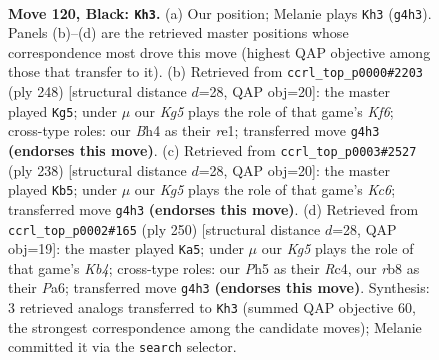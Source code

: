 \documentclass[11pt]{article}
\begin{document}
\clearpage

\begin{figure}[p]\centering
\begin{subfigure}{0.46\textwidth}\centering
\resizebox{\linewidth}{!}{%
\newchessgame
\chessboard[
  setfen={1R6/3r3n/8/4p2p/6kb/8/3p4/3K4 b - - 5 120},
  showmover=false,
  pgfstyle=straightmove, color=movearrow, markmove={g4-h3}
]}
\caption{}
\end{subfigure}\hfill
\begin{subfigure}{0.46\textwidth}\centering
\resizebox{\linewidth}{!}{%
\newchessgame
\chessboard[
  setfen={8/7k/5K1P/5P2/8/8/7R/4r3 w - - 65 125},
  showmover=false,
  pgfstyle=straightmove, color=movearrow, markmove={f6-g5}
]}
\caption{}
\end{subfigure}
\\[4pt]
\begin{subfigure}{0.46\textwidth}\centering
\resizebox{\linewidth}{!}{%
\newchessgame
\chessboard[
  setfen={8/k7/P1K5/2P5/8/R7/8/7r w - - 79 120},
  showmover=false,
  pgfstyle=straightmove, color=movearrow, markmove={c6-b5}
]}
\caption{}
\end{subfigure}\hfill
\begin{subfigure}{0.46\textwidth}\centering
\resizebox{\linewidth}{!}{%
\newchessgame
\chessboard[
  setfen={8/8/P1k5/2P5/1KR5/8/8/6r1 w - - 1 126},
  showmover=false,
  pgfstyle=straightmove, color=movearrow, markmove={b4-a5}
]}
\caption{}
\end{subfigure}
\caption{\textbf{Move 120, Black: \texttt{Kh3}.} (a) Our position; Melanie plays \texttt{Kh3} (\texttt{g4h3}). Panels (b)--(d) are the retrieved master positions whose correspondence most drove this move (highest QAP objective among those that transfer to it). (b) Retrieved from \texttt{ccrl\_top\_p0000\#2203} (ply 248) [structural distance $d$=28, QAP obj=20]: the master played \texttt{Kg5}; under $\mu$ our \emph{Kg5} plays the role of that game's \emph{Kf6}; cross-type roles: our \emph{B}h4 as their \emph{r}e1; transferred move \texttt{g4h3} \textbf{(endorses this move)}. (c) Retrieved from \texttt{ccrl\_top\_p0003\#2527} (ply 238) [structural distance $d$=28, QAP obj=20]: the master played \texttt{Kb5}; under $\mu$ our \emph{Kg5} plays the role of that game's \emph{Kc6}; transferred move \texttt{g4h3} \textbf{(endorses this move)}. (d) Retrieved from \texttt{ccrl\_top\_p0002\#165} (ply 250) [structural distance $d$=28, QAP obj=19]: the master played \texttt{Ka5}; under $\mu$ our \emph{Kg5} plays the role of that game's \emph{Kb4}; cross-type roles: our \emph{P}h5 as their \emph{R}c4, our \emph{r}b8 as their \emph{P}a6; transferred move \texttt{g4h3} \textbf{(endorses this move)}. Synthesis: 3 retrieved analogs transferred to \texttt{Kh3} (summed QAP objective 60, the strongest correspondence among the candidate moves); Melanie committed it via the \texttt{search} selector.}
\label{fig:thought-m239}
\end{figure}
\end{document}

